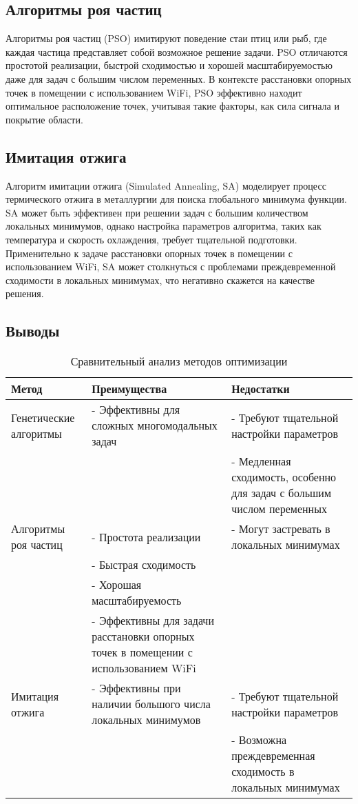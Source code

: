 \subsection{Алгоритмы роя частиц}

Алгоритмы роя частиц (PSO) имитируют поведение стаи птиц или рыб, где каждая частица представляет собой возможное решение задачи.
PSO отличаются простотой реализации, быстрой сходимостью и хорошей масштабируемостью даже для задач с большим числом переменных.
В контексте расстановки опорных точек в помещении с использованием WiFi, PSO эффективно находит оптимальное расположение точек, учитывая такие факторы, как сила сигнала и покрытие области.

\subsection{Имитация отжига}

Алгоритм имитации отжига (Simulated Annealing, SA) моделирует процесс термического отжига в металлургии для поиска глобального минимума функции.
SA может быть эффективен при решении задач с большим количеством локальных минимумов, однако настройка параметров алгоритма, таких как температура и скорость охлаждения, требует тщательной подготовки.
Применительно к задаче расстановки опорных точек в помещении с использованием WiFi, SA может столкнуться с проблемами преждевременной сходимости в локальных минимумах, что негативно скажется на качестве решения.

\subsection{Выводы}

\begin{table}[H]
    \caption{Сравнительный анализ методов оптимизации}
    \centering
    \begin{tabular}{|m{5cm}|m{5cm}|m{5cm}|}
    \hline
    Метод & Преимущества & Недостатки \\
    \hline
    Генетические алгоритмы & - Эффективны для сложных многомодальных задач & - Требуют тщательной настройки параметров \\
    & & - Медленная сходимость, особенно для задач с большим числом переменных \\
    \hline
    Алгоритмы роя частиц & - Простота реализации & - Могут застревать в локальных минимумах \\
    & - Быстрая сходимость & \\
    & - Хорошая масштабируемость & \\
    & - Эффективны для задачи расстановки опорных точек в помещении с использованием WiFi & \\
    \hline
    Имитация отжига & - Эффективны при наличии большого числа локальных минимумов & - Требуют тщательной настройки параметров \\
    & & - Возможна преждевременная сходимость в локальных минимумах \\
    \hline
    \end{tabular}
\end{table}

